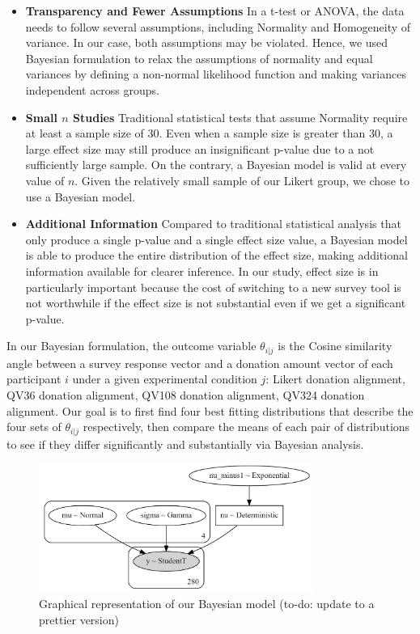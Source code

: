\begin{itemize}
    \item \textbf{Transparency and Fewer Assumptions} In a t-test or ANOVA, the data needs to follow several assumptions, including Normality and Homogeneity of variance. In our case, both assumptions may be violated. Hence, we used Bayesian formulation to relax the assumptions of normality and equal variances by defining a non-normal likelihood function and making variances independent across groups.
    \item \textbf{Small $n$ Studies} Traditional statistical tests that assume Normality require at least a sample size of 30. Even when a sample size is greater than 30, a large effect size may still produce an insignificant p-value due to a not sufficiently large sample. On the contrary, a Bayesian model is valid at every value of $n$. Given the relatively small sample of our Likert group, we chose to use a Bayesian model.
    \item \textbf{Additional Information} Compared to traditional statistical analysis that only produce a single p-value and a single effect size value, a Bayesian model is able to produce the entire distribution of the effect size, making additional information available for clearer inference. In our study, effect size is in particularly important because the cost of switching to a new survey tool is not worthwhile if the effect size is not substantial even if we get a significant p-value.
\end{itemize}

In our Bayesian formulation, the outcome variable $\theta_{i|j}$ is the Cosine similarity angle between a survey response vector and a donation amount vector of each participant $i$ under a given experimental condition $j$: Likert donation alignment, QV36 donation alignment, QV108 donation alignment, QV324  donation alignment. Our goal is to first find four best fitting distributions that describe the four sets of $\theta_{i|j}$ respectively, then compare the means of each pair of distributions to see if they differ significantly and substantially via Bayesian analysis. 

\begin{figure}[htpb]
    \centering
    \includegraphics[width=0.8\textwidth, keepaspectratio=true]{content/image/model_graph.png}
    \caption{
      Graphical representation of our Bayesian model (to-do: update to a prettier version)
    }
    \label{fig:bayesian_model_exp1}
\end{figure}

